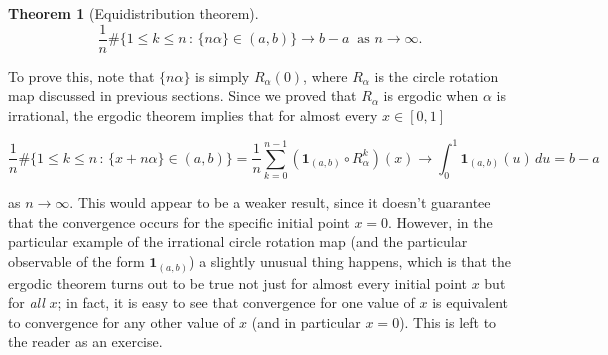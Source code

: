 \documentclass[11pt]{report}
\theoremstyle{plain}
\newtheorem{thm}{Theorem}[chapter]
\theoremstyle{definition}
\begin{document}
\begin{enumerate}[label=\arabic*.]
\begin{thm}[Equidistribution theorem]
\[
\frac{1}{n} \# \Big\{ 1\le k\le n\,:\, \{n\alpha\}\in (a,b) \Big\} \to b-a\ \textrm{ as }n\to\infty.
\]

\end{thm}

To prove this, note that $\{ n\alpha \}$ is simply $R_\alpha(0)$, where $R_\alpha$ is the circle rotation map discussed in previous sections. Since we proved that $R_\alpha$ is ergodic when $\alpha$ is irrational, the ergodic theorem implies that for almost every $x\in[0,1]$

\[
\frac{1}{n} \# \Big\{ 1\le k\le n\,:\, \{x+n\alpha\}\in (a,b) \Big\}
= \frac{1}{n} \sum_{k=0}^{n-1} \left(\mathbf{1}_{(a,b)}\circ R_\alpha^k\right) (x)
\to \int_0^1 \mathbf{1}_{(a,b)}(u)\,du = b-a
\]

as $n\to\infty$. This would appear to be a weaker result, since it doesn't guarantee that the convergence occurs for the specific initial point $x=0$. However, in the particular example of the irrational circle rotation map (and the particular observable of the form $\mathbf{1}_{(a,b)}$) a slightly unusual thing happens, which is that the ergodic theorem turns out to be true not just for almost every initial point $x$ but for \emph{all} $x$; in fact, it is easy to see that convergence for one value of $x$ is equivalent to convergence for any other value of $x$ (and in particular $x=0$). This is left to the reader as an exercise.


\end{enumerate}
\end{document}
